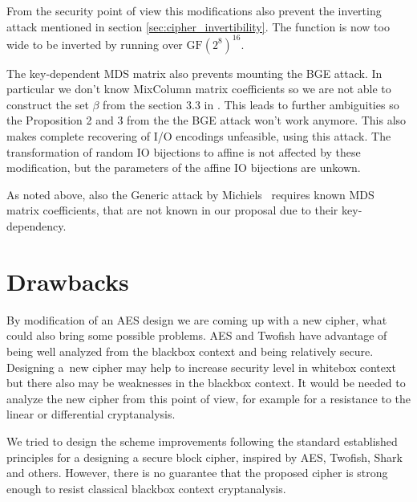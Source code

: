 \documentclass[11pt,oneside,final]{fithesis2}
\newcommand{\gfe}{\ensuremath{\text{GF}\left(2^8\right)}}
\begin{document}
    From the security point of view this modifications also prevent the inverting attack mentioned in section \ref{sec:cipher_invertibility}. The function is now too wide to be
    inverted by running over $\gfe^{16}$. 
    
    The key-dependent MDS matrix also prevents mounting the BGE attack. In particular we don't know MixColumn matrix coefficients so we are not able to construct the set $\beta$
    from the section 3.3 in \cite{Billet:2004:CWB:2080787.2080809}. This leads to further ambiguities so the Proposition 2 and 3 from the the BGE attack won't work anymore. 
    This also makes complete recovering of I/O encodings unfeasible, using this attack. 
    The transformation of random IO bijections to affine is not affected by these modification, but the parameters of the affine IO bijections are unkown.

    As noted above, also the Generic attack by Michiels~\citep{Michiels:2007:MST:1314276.1314291} requires known MDS matrix coefficients, that are not known in our proposal
    due to their key-dependency.
    
    \section{Drawbacks}
    By modification of an AES design we are coming up with a new cipher, what could also bring some possible problems. AES and Twofish have advantage of being well analyzed from the blackbox 
    context and being relatively secure. Designing a~new cipher may help to increase security level in whitebox context but there also may be weaknesses in the blackbox context. 
    It would be needed to analyze the new cipher from this point of view, for example for a resistance to the linear or differential cryptanalysis.

    We tried to design the scheme improvements following the standard established principles for a designing a secure block cipher, inspired by AES, Twofish, Shark and others.
    However, there is no guarantee that the proposed cipher is strong enough to resist classical blackbox context cryptanalysis.
    
%     
\end{document}
